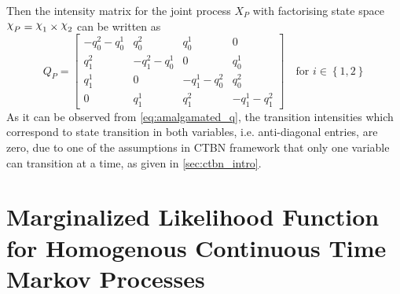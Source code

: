 Then the intensity matrix for the joint process $ X_P $ with factorising state space $ \rchi_P = \rchi_1 \times \rchi_2 $ can be written as
\begin{equation}
Q_P = 
\begin{bmatrix}
-q^{2}_{0}-q^{1}_{0} & q^{2}_{0} & q^{1}_{0} & 0 \\
q^{2}_{1} & -q^{2}_{1}-q^{1}_{0} & 0 & q^{1}_{0} \\
q^{1}_{1} & 0 & -q^{1}_{1}-q^{2}_{0} & q^{2}_{0} \\
0 & q^{1}_{1} & q^{2}_{1} & -q^{1}_{1}-q^{2}_{1}
\end{bmatrix} \quad \text{for } i \in \left\lbrace 1,2\right\rbrace 
\label{eq:amalgamated_q}
\end{equation}
As it can be observed from \autoref{eq:amalgamated_q}, the transition intensities which correspond to state transition in both variables, i.e. anti-diagonal entries, are zero, due to one of the assumptions in CTBN framework that only one variable can transition at a time, as given in \cref{sec:ctbn_intro}.
\chapter{Marginalized Likelihood Function for Homogenous Continuous Time Markov Processes}
\label{ap:marg_llh_ctmp}

